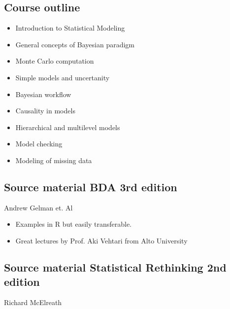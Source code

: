 \documentclass[letterpaper,10pt,english]{jupyterBook}
\begin{document}
\subsection{Course outline}
\label{\detokenize{Lecture 1:course-outline}}\begin{itemize}
\item {} 
\sphinxAtStartPar
Introduction to Statistical Modeling

\item {} 
\sphinxAtStartPar
General concepts of Bayesian paradigm

\item {} 
\sphinxAtStartPar
Monte Carlo computation

\item {} 
\sphinxAtStartPar
Simple models and uncertanity

\item {} 
\sphinxAtStartPar
Bayesian workflow

\item {} 
\sphinxAtStartPar
Causality in models

\item {} 
\sphinxAtStartPar
Hierarchical and multilevel models

\item {} 
\sphinxAtStartPar
Model checking

\item {} 
\sphinxAtStartPar
Modeling of missing data

\end{itemize}


\subsection{Source material \sphinxhyphen{} BDA 3rd edition}
\label{\detokenize{Lecture 1:source-material-bda-3rd-edition}}
\sphinxAtStartPar
Andrew Gelman et. Al


\begin{itemize}
\item {} 
\sphinxAtStartPar
Examples in R but easily transferable.

\item {} 
\sphinxAtStartPar
Great lectures by Prof. Aki Vehtari from Alto University 

\end{itemize}


\subsection{Source material \sphinxhyphen{} Statistical Rethinking 2nd edition}
\label{\detokenize{Lecture 1:source-material-statistical-rethinking-2nd-edition}}
\sphinxAtStartPar
Richard McElreath
\end{document}
